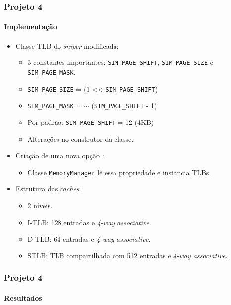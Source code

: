 \documentclass[10pt]{beamer}
\begin{document}
\begin{frame}
\frametitle{Projeto 4}
\framesubtitle{Implementação}

\begin{itemize}

\item Classe TLB do \textit{sniper} modificada:

\begin{itemize} 
	\item 3 constantes importantes: \texttt{SIM\_PAGE\_SHIFT},
	\texttt{SIM\_PAGE\_SIZE} e \texttt{SIM\_PAGE\_MASK}.
	\item \texttt{SIM\_PAGE\_SIZE} = (1 << \texttt{SIM\_PAGE\_SHIFT})
	\item \texttt{SIM\_PAGE\_MASK} = \(\sim\) (\texttt{SIM\_PAGE\_SHIFT} - 1)
	\item Por padrão: \texttt{SIM\_PAGE\_SHIFT} = 12 (4KB)
	\item Alterações no construtor da classe. 
		
\end{itemize} 

\item Criação de uma nova opção :
 
\begin{itemize} 
	\item Classe \texttt{MemoryManager} lê essa propriedade e instancia TLBs.
\end{itemize}

\item Estrutura das \textit{caches}:

\begin{itemize}
  	\item 2 níveis.  
	\item I-TLB: 128 entradas e \textit{4-way associative}.
	\item D-TLB: 64 entradas e \textit{4-way associative}.
	\item STLB: TLB compartilhada com 512 entradas e \textit{4-way associative}.
\end{itemize}
 
\end{itemize}

\end{frame}

\begin{frame}
\frametitle{Projeto 4}
\framesubtitle{Resultados}


\end{frame}
\end{document}
